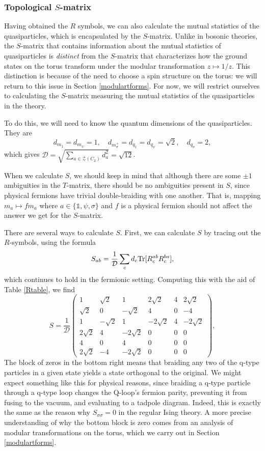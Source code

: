 \documentclass[12pt,a4paper]{article}
\newcommand{\unit}{\mathds{1}}
\newcommand{\mcz}{\mathcal{Z}}
\newcommand{\mcd}{\mathcal{D}}
\newcommand\be            {\begin{equation}}
\newcommand\ee            {\end{equation}}
\begin{document}
\subsubsection{Topological $S$-matrix}

Having obtained the $R$ symbols, we can also calculate the mutual statistics of the quasiparticles, which is encapsulated by the $S$-matrix. Unlike in bosonic theories, the $S$-matrix that contains information about the mutual statistics of quasiparticles is {\it distinct} from the $S$-matrix that characterizes how the ground states on the torus transform under the modular transformation $z\mapsto 1/z$. This distinction is because of the need to choose a spin structure on the torus: we will return to this issue in Section \ref{modulartforms}. For now, we will restrict ourselves to calculating the $S$-matrix measuring the mutual statistics of the quasiparticles in the theory. 

To do this, we will need to know the quantum dimensions of the quasiparticles. They are
\be d_{m_1} = d_{m_\psi} = 1,\quad d_{m_\sigma^+} = d_{q_1} = d_{q_\psi} = \sqrt{2},\quad d_{q_\sigma} = 2,\ee
which gives $\mcd = \sqrt{\sum_{a\in \mcz(C_2)} d_a^2} = \sqrt{12}$. 

When we calculate $S$, we should keep in mind that although there are some $\pm1$ ambiguities in the $T$-matrix, there should be no ambiguities present in $S$, since physical fermions have trivial double-braiding with one another. That is, mapping $m_a \mapsto fm_a$ where $a\in \{\unit,\psi,\sigma\}$ and $f$ is a physical fermion should not affect the answer we get for the $S$-matrix.

There are several ways to calculate $S$. 
First, we can calculate $S$ by tracing out the $R$-symbols, using the formula
\be \label{Smattr} S_{ab} = \frac{1}{\mcd}\sum_{c}d_c{\rm Tr}[R^{ab}_cR^{ba}_c],\ee
which continues to hold in the fermionic setting. Computing this with the aid of Table \ref{Rtable}, we find
\be 
 S= \frac{1}{\mcd} \begin{pmatrix} 
1&\sqrt{2}&1&2\sqrt{2}&4&2\sqrt{2} \\
 \sqrt{2}&0&-\sqrt{2}&4&0&-4 \\ 
 1&-\sqrt{2}&1&-2\sqrt{2}&4&-2\sqrt{2} \\ 
 2\sqrt{2}&4& -2\sqrt{2}&0&0&0 \\ 
 4&0&4&0&0&0 \\ 
  2\sqrt{2}&-4&- 2\sqrt{2}&0 & 0 & 0 \end{pmatrix}, \ee
The block of zeros in the bottom right means that braiding any two of the q-type particles in a given state yields a state orthogonal to the original. We might expect something like this for physical reasons, since braiding a q-type particle through a q-type loop changes the Q-loop's fermion parity, preventing it from fusing to the vacuum, and evaluating to a tadpole diagram. Indeed, this is exactly the same as the reason why $S_{\sigma\sigma}=0$ in the regular Ising theory. A more precise understanding of why the bottom block is zero comes from an analysis of modular transformations on the torus, which we carry out in Section \ref{modulartforms}.   
\end{document}
